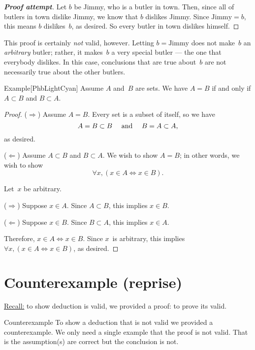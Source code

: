 \documentclass[../MATH-2000-Notes.tex]{subfiles}
\begin{document}
\begin{proof}[\textbf{Proof attempt}]
    Let $b$ be Jimmy, who is a butler in town.  Then, since all of butlers in town dislike Jimmy, we know that $b$ dislikes Jimmy. Since $\text{Jimmy} = b$, this means $b$ dislikes~$b$, as desired.  So every butler in town dislikes himself.
\end{proof}
This proof is certainly \emph{not} valid, however.  Letting $b = \text{Jimmy}$ does not make~$b$ an \emph{arbitrary} butler; rather, it makes~$b$ a very special butler --- the one that everybody dislikes. In this case, conclusions that are true about~$b$ are not necessarily true about the other butlers.

\begin{commentbox}{Example}[{PhbLightCyan}]
    Assume $A$ and~$B$ are sets. We have $A = B$ if and only if $A \subset B$ and $B \subset A$.
\end{commentbox}
\begin{proof}
    ($\Rightarrow$) Assume $A = B$. 
    Every set is a subset of itself, so we have 
    $$ \text{$A = B \subset B$ \quad and \quad $B = A \subset A$,}$$
    as desired.
    
    ($\Leftarrow$) Assume $A \subset B$ and $B \subset A$. We wish to show $A = B$; in other words, we wish to show 
        $$ \forall x,  (x \in A \Leftrightarrow x \in B) .$$
    
    Let~$x$ be arbitrary.
    
    \qquad($\Rightarrow$) Suppose $x \in A$. Since $A \subset B$, this implies $x \in B$.
    
    \qquad($\Leftarrow$) Suppose $x \in B$. Since $B \subset A$, this implies $x \in A$.
    
    \noindent Therefore, $x \in A \Leftrightarrow x \in B$. 
    Since $x$~is arbitrary, this implies $\forall x, (x \in A \Leftrightarrow x \in B)$, as desired.
\end{proof}

\section{Counterexample (reprise)}
\underline{Recall:} to show  deduction is valid, we provided a proof: to prove its valid.

\begin{Definition}
    {Counterexample}
    To show a deduction that is not valid we provided a counterexample. We only need a single example that the proof is not valid. That is the assumption(s) are correct but the conclusion is not.
\end{Definition}
\end{document}
